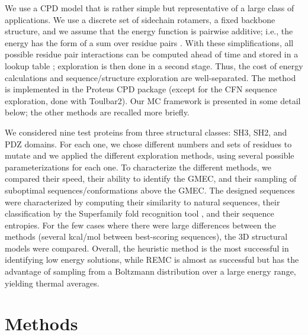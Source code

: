 \documentclass[a4paper,12pt]{article}
\begin{document}
We use a CPD model that is rather simple but representative of a large class of applications. We use a discrete
set of sidechain rotamers, a fixed backbone structure, and we assume that the energy function is pairwise additive;
i.e., the energy has the form of a sum over residue pairs \cite{Schmidt08b,Schmidt08,Simonson13b}. With these
simplifications, all possible residue pair interactions can be computed ahead of time and stored in a lookup table
\cite{Dahiyat97}; exploration is then done in a second stage. Thus, the cost of energy calculations and
sequence/structure exploration are well-separated. The method is implemented in the Proteus CPD package
\cite{Schmidt08,Simonson13b} (except for the CFN sequence exploration, done with Toulbar2). Our MC framework is
presented in some detail below; the other methods are recalled more briefly.

We considered nine test proteins from three structural classes: SH3, SH2, and PDZ domains. For each one, we chose
different numbers and sets of residues to mutate and we applied the different exploration methods, using several
possible parameterizations for each one. To characterize the different methods, we compared their speed, their
ability to identify the GMEC, and their sampling of suboptimal sequences/conformations above the GMEC. The
designed sequences were characterized by computing their similarity to natural sequences, their classification
by the Superfamily fold recognition tool \cite{Gough01,Wilson07}, and their sequence entropies. For the few cases
where there were large differences between the methods (several kcal/mol between best-scoring sequences), the 3D
structural models were compared. Overall, the heuristic method is the most successful in identifying low energy
solutions, while REMC is almost as successful but has the advantage of sampling from a Boltzmann distribution over
a large energy range, yielding thermal averages.

\section{Methods}
\end{document}
